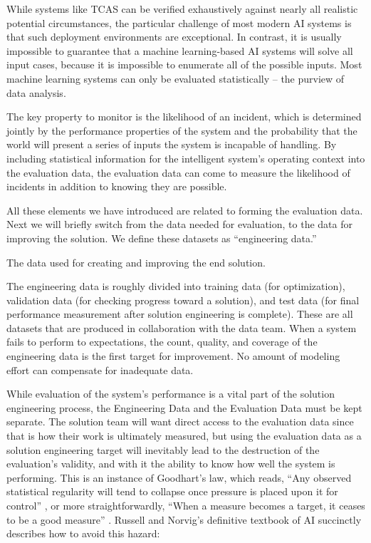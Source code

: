 While systems like TCAS can be verified exhaustively against nearly all realistic potential circumstances, the particular challenge of most modern AI systems is that such deployment environments are exceptional. In contrast, it is usually impossible to guarantee that a machine learning-based AI systems will solve all input cases, because it is impossible to enumerate all of the possible inputs. Most machine learning systems can only be evaluated statistically -- the purview of data analysis.

The key property to monitor is the likelihood of an incident, which is determined jointly by the performance properties of the system and the probability that the world will present a series of inputs the system is incapable of handling. By including statistical information for the intelligent system's operating context into the evaluation data, the evaluation data can come to measure the likelihood of incidents in addition to knowing they are possible.

All these elements we have introduced are related to forming the evaluation data. Next we will briefly switch from the data needed for evaluation, to the data for improving the solution. We define these datasets as ``engineering data.''

\begin{definition}
    The data used for creating and improving the end solution.
\end{definition}

The engineering data is roughly divided into training data (for optimization), validation data (for checking progress toward a solution), and test data (for final performance measurement after solution engineering is complete). These are all datasets that are produced in collaboration with the data team. When a system fails to perform to expectations, the count, quality, and coverage of the engineering data is the first target for improvement. No amount of modeling effort can compensate for inadequate data.

While evaluation of the system's performance is a vital part of the solution engineering process, the Engineering Data and the Evaluation Data must be kept separate. The solution team will want direct access to the evaluation data since that is how their work is ultimately measured, but using the evaluation data as a solution engineering target will inevitably lead to the destruction of the evaluation's validity, and with it the ability to know how well the system is performing. This is an instance of Goodhart's law, which reads, ``Any observed statistical regularity will tend to collapse once pressure is placed upon it for control'' \cite{manheim_categorizing_2019}, or more straightforwardly, ``When a measure becomes a target, it ceases to be a good measure'' \cite{strathern_improving_1997}. Russell and Norvig's definitive textbook of AI \cite{stuart_russell_artificial_2009} succinctly describes how to avoid this hazard:

